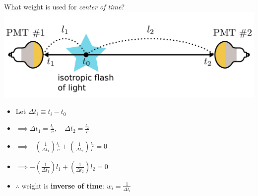 \documentclass[14pt]{beamer}
\begin{document}
\begin{frame}{What weight is used for \emph{\color{blue}center of time}?}
	\includegraphics[width=\linewidth]{simple_example_of_center_of_time.pdf}
	\begin{itemize}
		\item[] Let $\Delta t_i \equiv t_i - t_0$
		\item[] $\implies \Delta t_1 = \frac{l_1}{c},\quad\Delta t_2 =
			\frac{l_2}{c}$
		\item[] $\implies -(\frac{1}{\Delta t_1})\frac{l_1}{c} +
			(\frac{1}{\Delta t_2})\frac{l_2}{c} = 0$
		\item[] $\implies -(\frac{1}{\Delta t_1})l_1 +
			(\frac{1}{\Delta t_2})l_2 = 0$
		\item[] $\therefore$ weight is \textbf{inverse of time}: $w_{i} =
			\frac{1}{\Delta t_{i}}$
	\end{itemize}
\end{frame}

\end{document}
